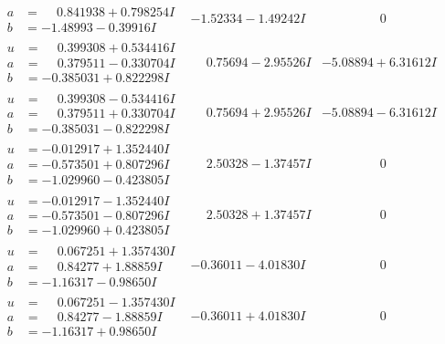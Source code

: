 \documentclass[1p]{elsarticle_modified}
\theoremstyle{definition}
\begin{document}
$$\begin{array}{c|c|c}
\begin{aligned}
a &= \phantom{-}0.841938 + 0.798254 I \\
b &= -1.48993 - 0.39916 I\end{aligned}
 & -1.52334 - 1.49242 I & \phantom{-0.000000 } 0 \\ \hline\begin{aligned}
u &= \phantom{-}0.399308 + 0.534416 I \\
a &= \phantom{-}0.379511 - 0.330704 I \\
b &= -0.385031 + 0.822298 I\end{aligned}
 & \phantom{-}0.75694 - 2.95526 I & -5.08894 + 6.31612 I \\ \hline\begin{aligned}
u &= \phantom{-}0.399308 - 0.534416 I \\
a &= \phantom{-}0.379511 + 0.330704 I \\
b &= -0.385031 - 0.822298 I\end{aligned}
 & \phantom{-}0.75694 + 2.95526 I & -5.08894 - 6.31612 I \\ \hline\begin{aligned}
u &= -0.012917 + 1.352440 I \\
a &= -0.573501 + 0.807296 I \\
b &= -1.029960 - 0.423805 I\end{aligned}
 & \phantom{-}2.50328 - 1.37457 I & \phantom{-0.000000 } 0 \\ \hline\begin{aligned}
u &= -0.012917 - 1.352440 I \\
a &= -0.573501 - 0.807296 I \\
b &= -1.029960 + 0.423805 I\end{aligned}
 & \phantom{-}2.50328 + 1.37457 I & \phantom{-0.000000 } 0 \\ \hline\begin{aligned}
u &= \phantom{-}0.067251 + 1.357430 I \\
a &= \phantom{-}0.84277 + 1.88859 I \\
b &= -1.16317 - 0.98650 I\end{aligned}
 & -0.36011 - 4.01830 I & \phantom{-0.000000 } 0 \\ \hline\begin{aligned}
u &= \phantom{-}0.067251 - 1.357430 I \\
a &= \phantom{-}0.84277 - 1.88859 I \\
b &= -1.16317 + 0.98650 I\end{aligned}
 & -0.36011 + 4.01830 I & \phantom{-0.000000 } 0 \\ \hline\begin{aligned}

\end{aligned}
\end{array}$$
\end{document}
